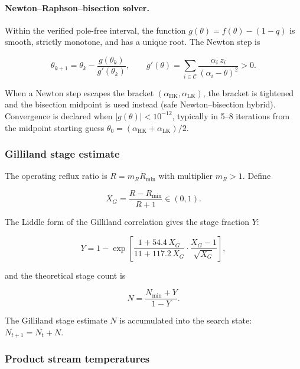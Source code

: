 \documentclass[11pt,a4paper]{article}
\theoremstyle{definition}
\theoremstyle{plain}
\newcommand{\calC}{\mathcal{C}}
\newcommand{\abs}[1]{\left|#1\right|}
\begin{document}
\paragraph{Newton--Raphson--bisection solver.}
Within the verified pole-free interval, the function $g(\theta) = f(\theta) - (1-q)$ is smooth, strictly monotone, and has a unique root. The Newton step is

\begin{equation}
 \theta_{k+1} = \theta_k - \frac{g(\theta_k)}{g'(\theta_k)},
 \qquad
 g'(\theta) = \sum_{i \in \calC}
  \frac{\alpha_i\, z_i}{(\alpha_i - \theta)^2} > 0.
\end{equation}

When a Newton step escapes the bracket
$(\alpha_{\mathrm{HK}}, \alpha_{\mathrm{LK}})$, the bracket is tightened and the bisection midpoint is used instead (safe Newton--bisection hybrid). Convergence is declared when $\abs{g(\theta)} < 10^{-12}$, typically in 5--8 iterations from the midpoint starting guess $\theta_0 = (\alpha_{\mathrm{HK}} + \alpha_{\mathrm{LK}})/2$.

\subsubsection{Gilliland stage estimate}
\label{sec:gilliland}

The operating reflux ratio is $R = m_R R_{\min}$ with multiplier $m_R > 1$. Define

\begin{equation}
 X_G = \frac{R - R_{\min}}{R + 1} \in (0,1).
\end{equation}

The Liddle form of the Gilliland correlation gives the stage fraction $Y$:

\begin{equation}
 Y = 1 - \exp\!\left[
  \frac{1 + 54.4\, X_G}{11 + 117.2\, X_G}
  \cdot \frac{X_G - 1}{\sqrt{X_G}}
 \right],
 \label{eq:gilliland_Y}
\end{equation}

and the theoretical stage count is

\begin{equation}
 N = \frac{N_{\min} + Y}{1 - Y}.
 \label{eq:gilliland_N}
\end{equation}

The Gilliland stage estimate $N$ is accumulated into the search state: $N_{t+1} = N_t + N$.

\subsubsection{Product stream temperatures}
\end{document}
